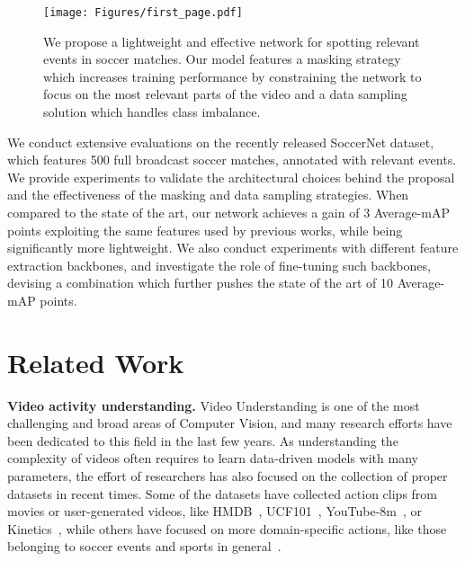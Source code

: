 \documentclass[a4paper,conference]{IEEEtran}
\newcommand{\tit}[1]{\smallbreak\noindent\textbf{#1.}}
\begin{document}
\begin{figure}[t]
\centering
\texttt{[image: Figures/first\_page.pdf]}
\caption{We propose a lightweight and effective network for spotting relevant events in soccer matches. Our model features a masking strategy which increases training performance by constraining the network to focus on the most relevant parts of the video and a data sampling solution which handles class imbalance.}
\label{fig:first_page}
\end{figure}

We conduct extensive evaluations on the recently released SoccerNet dataset, which features 500 full broadcast soccer matches, annotated with relevant events. We provide experiments to validate the architectural choices behind the proposal and the effectiveness of the masking and data sampling strategies. When compared to the state of the art, our network achieves a gain of 3 Average-mAP points exploiting the same features used by previous works, while being significantly more lightweight. We also conduct experiments with different feature extraction backbones, and investigate the role of fine-tuning such backbones, devising a combination which further pushes the state of the art of 10 Average-mAP points. 


















\section{Related Work}

\tit{Video activity understanding}
Video Understanding is one of the most challenging and broad areas of Computer Vision, and many research efforts have been dedicated to this field in the last few years. As understanding the complexity of videos often requires to learn data-driven models with many parameters, the effort of researchers has also focused on the collection of proper datasets in recent times. Some of the datasets have collected action clips from movies or user-generated videos, like HMDB~\cite{kuehne2011hmdb}, UCF101~\cite{soomro2012ucf101}, YouTube-8m~\cite{abu2016youtube}, or Kinetics~\cite{kay2017kinetics}, while others have focused on more domain-specific actions, like those belonging to soccer events and sports in general~\cite{karpathy2014large,giancola2018soccernet}.
\end{document}
